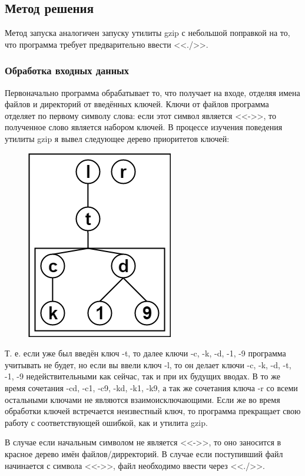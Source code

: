 \documentclass[12pt]{article}
\begin{document}
\subsection*{Метод решения}

Метод запуска аналогичен запуску утилиты gzip с небольшой поправкой на то, что программа требует предварительно ввести <<./>>.

\subsubsection*{Обработка входных данных}

Первоначально программа обрабатывает то, что получает на входе, отделяя имена файлов и директорий от введённых ключей. Ключи от файлов программа отделяет по первому символу слова: если этот символ является <<->>, то полученное слово является набором ключей. В процессе изучения поведения утилиты gzip я вывел следующее дерево приоритетов ключей:

\begin{figure}[h!]
	\centering\includegraphics[scale=0.5]{KeyTree}
\end{figure}

Т. е. если уже был введён ключ -t, то далее ключи -c, -k, -d, -1, -9 программа учитывать не будет, но если вы ввели ключ -l, то он делает ключи -c, -k, -d, -t, -1, -9 недействительными как сейчас, так и при их будущих вводах. В то же время сочетания -cd, -c1, -c9, -kd, -k1, -k9, а так же сочетания ключа -r со всеми остальными ключами не являются взаимоисключающими. Если же во время обработки ключей встречается неизвестный ключ, то программа прекращает свою работу с соответствующей ошибкой, как и утилита gzip.

В случае если начальным символом не является <<->>, то оно заносится в красное дерево имён файлов/дирректорий. В случае если поступивший файл начинается с символа <<->>, файл необходимо ввести через <<./>>.
\end{document}
